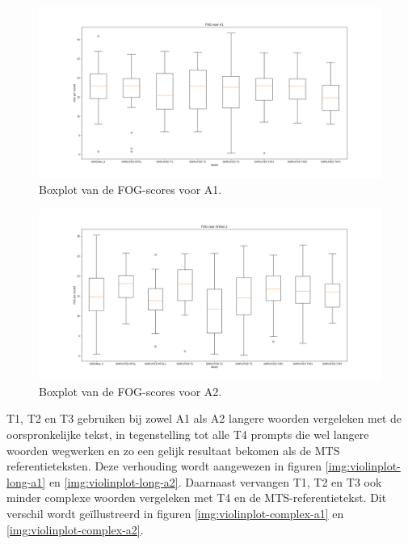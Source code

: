 \begin{figure}
	\includegraphics[width=\linewidth]{img/boxplot-fog-a1.png}
	\caption{Boxplot van de FOG-scores voor A1.}
	\label{img:boxplot-fog-a1}
\end{figure}

\begin{figure}
	\includegraphics[width=\linewidth]{img/boxplot-fog-a2.png}
	\caption{Boxplot van de FOG-scores voor A2.}
	\label{img:boxplot-fog-a2}
\end{figure}

T1, T2 en T3 gebruiken bij zowel A1 als A2 langere woorden vergeleken met de oorspronkelijke tekst, in tegenstelling tot alle T4 prompts die wel langere woorden wegwerken en zo een gelijk resultaat bekomen als de MTS referentieteksten. Deze verhouding wordt aangewezen in figuren \ref{img:violinplot-long-a1} en \ref{img:violinplot-long-a2}. Daarnaast vervangen T1, T2 en T3 ook minder complexe woorden vergeleken met T4 en de MTS-referentietekst. Dit verschil wordt geïllustreerd in figuren \ref{img:violinplot-complex-a1} en \ref{img:violinplot-complex-a2}.


